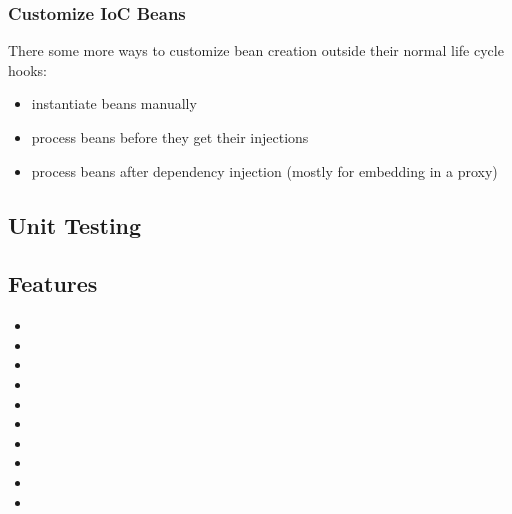 \subsubsection{Customize IoC Beans}

There some more ways to customize bean creation outside their normal life cycle hooks:

\begin{itemize}
	\item {} instantiate beans manually
	\item {} process beans before they get their injections
	\item {} process beans after dependency injection (mostly for embedding in a proxy)
\end{itemize}

\subsection{Unit Testing}
\TODO
\subsection{Features}
\begin{itemize}
	\item {}
	\item {}
	\item {}
	\item {}
	\item {}
	\item {}
	\item {}
	\item {}
	\item {}
	\item {}
\end{itemize}
